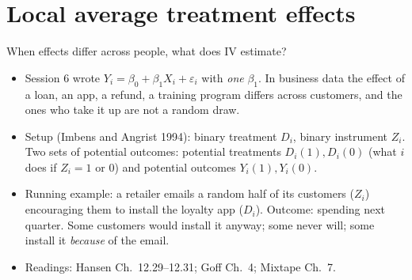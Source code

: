 \documentclass[aspectratio=169,11pt]{beamer}
\begin{document}
\section{Local average treatment effects}

\begin{frame}{When effects differ across people, what does IV estimate?}
\begin{itemize}
	\item Session 6 wrote $Y_i = \beta_0 + \beta_1 X_i + \varepsilon_i$ with \emph{one} $\beta_1$. In business data the
	effect of a loan, an app, a refund, a training program differs across customers, and the ones who take it
	up are not a random draw.
	\medskip
	\item Setup (Imbens and Angrist 1994): binary treatment $D_i$, binary instrument $Z_i$. Two sets of potential
	outcomes: \alert{potential treatments} $D_i(1), D_i(0)$ (what $i$ does if $Z_i = 1$ or $0$) and potential
	outcomes $Y_i(1), Y_i(0)$.
	\medskip
	\item Running example: a retailer emails a random half of its customers ($Z_i$) encouraging them to install
	the loyalty app ($D_i$). Outcome: spending next quarter. Some customers would install it anyway; some never
	will; some install it \emph{because} of the email.
	\medskip
	\item Readings: Hansen Ch.~12.29--12.31; Goff Ch.~4; Mixtape Ch.~7.
\end{itemize}
\end{frame}
\end{document}
